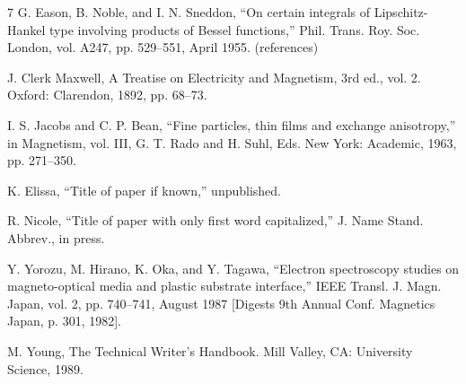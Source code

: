 \documentclass[conference,a4paper,10pt]{IEEEtran}
\begin{document}
\begin{thebibliography}{7}
G. Eason, B. Noble, and I. N. Sneddon, ``On certain integrals of
Lipschitz-Hankel type involving products of Bessel functions,'' Phil. Trans.
Roy. Soc. London, vol. A247, pp. 529--551, April 1955. (references)

J. Clerk Maxwell, A Treatise on Electricity and Magnetism, 3rd ed., vol. 2.
Oxford: Clarendon, 1892, pp. 68--73.

I. S. Jacobs and C. P. Bean, ``Fine particles, thin films and exchange
anisotropy,'' in Magnetism, vol. III, G. T. Rado and H. Suhl, Eds. New York:
Academic, 1963, pp. 271--350.

K. Elissa, ``Title of paper if known,'' unpublished.

R. Nicole, ``Title of paper with only first word capitalized,'' J. Name Stand.
Abbrev., in press.

Y. Yorozu, M. Hirano, K. Oka, and Y. Tagawa, ``Electron spectroscopy studies on
magneto-optical media and plastic substrate interface,'' IEEE Transl. J. Magn.
Japan, vol. 2, pp. 740--741, August 1987 [Digests 9th Annual Conf. Magnetics
Japan, p. 301, 1982].

M. Young, The Technical Writer's Handbook. Mill Valley, CA: University Science,
1989.
\end{thebibliography}
\end{document}
